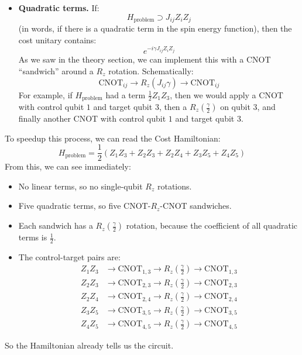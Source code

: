 \begin{deepeningbox}
\begin{itemize}
        \item \textbf{Quadratic terms.} If:
            \begin{equation*}
                H_{\text{problem}} \supset J_{ij} Z_i Z_j
            \end{equation*}
            (in words, if there is a quadratic term in the spin energy function), then the cost unitary contains:
            \begin{equation*}
                e^{-i \gamma J_{ij} Z_i Z_j}
            \end{equation*}
            As we saw in the theory section, we can implement this with a CNOT ``sandwich'' around a $R_z$ rotation. Schematically:
            \begin{equation*}
                \text{CNOT}_{ij} \to R_{z}\left(J_{ij} \gamma\right) \to \text{CNOT}_{ij}
            \end{equation*}
            For example, if $H_{\text{problem}}$ had a term $\frac{1}{2} Z_1 Z_3$, then we would apply a CNOT with control qubit $1$ and target qubit $3$, then a $R_z(\frac{\gamma}{2})$ on qubit $3$, and finally another CNOT with control qubit $1$ and target qubit $3$.
    \end{itemize}
    \textcolor{Green3}{} To speedup this process, we can read the Cost Hamiltonian:
    \begin{equation*}
        H_{\text{problem}} = \frac{1}{2}\left(Z_1Z_3 + Z_2Z_3 + Z_2Z_4 + Z_3Z_5 + Z_4Z_5\right)
    \end{equation*}
    From this, we can see immediately:
    \begin{itemize}
        \item No linear terms, so no single-qubit $R_z$ rotations.
        \item Five quadratic terms, so five CNOT-$R_z$-CNOT sandwiches.
        \item Each sandwich has a $R_z(\frac{\gamma}{2})$ rotation, because the coefficient of all quadratic terms is $\frac{1}{2}$.
        \item The control-target pairs are:
            \begin{align*}
                Z_1 Z_3 & \to \text{CNOT}_{1,3} \to R_z\left(\frac{\gamma}{2}\right) \to \text{CNOT}_{1,3} \\[.3em]
                Z_2 Z_3 & \to \text{CNOT}_{2,3} \to R_z\left(\frac{\gamma}{2}\right) \to \text{CNOT}_{2,3} \\[.3em]
                Z_2 Z_4 & \to \text{CNOT}_{2,4} \to R_z\left(\frac{\gamma}{2}\right) \to \text{CNOT}_{2,4} \\[.3em]
                Z_3 Z_5 & \to \text{CNOT}_{3,5} \to R_z\left(\frac{\gamma}{2}\right) \to \text{CNOT}_{3,5} \\[.3em]
                Z_4 Z_5 & \to \text{CNOT}_{4,5} \to R_z\left(\frac{\gamma}{2}\right) \to \text{CNOT}_{4,5}
            \end{align*}
    \end{itemize}
    So the Hamiltonian already tells us the circuit.


\end{deepeningbox}
